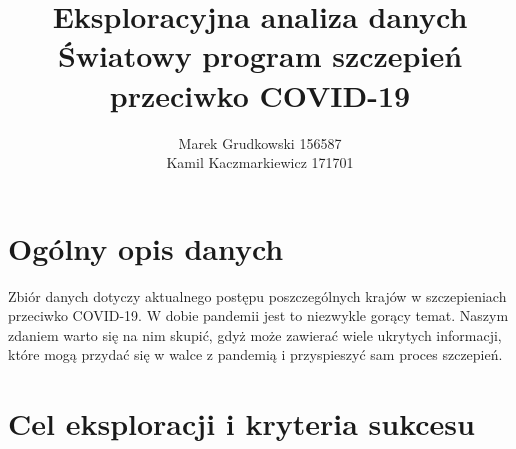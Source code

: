 \documentclass[12pt, oneside, openany]{article}
\title{
	Eksploracyjna analiza danych \\
	Światowy program szczepień przeciwko COVID-19
}
\author{
	Marek Grudkowski 156587
	\\
	Kamil Kaczmarkiewicz 171701
}
\begin{document}
\maketitle

\section{Ogólny opis danych}

Zbiór danych dotyczy aktualnego postępu poszczególnych krajów w szczepieniach przeciwko COVID-19. W dobie pandemii jest to niezwykle gorący temat. Naszym zdaniem warto się na nim skupić, gdyż może zawierać wiele ukrytych informacji, które mogą przydać się w walce z pandemią i przyspieszyć sam proces szczepień. 

\section{Cel eksploracji i kryteria sukcesu}
\end{document}
